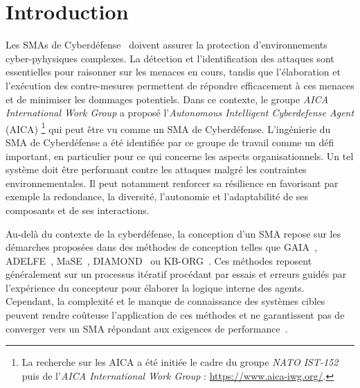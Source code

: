 \documentclass[contribution]{jfsma}
\begin{document}

\section{Introduction}


Les SMAs de Cyberdéfense~\cite{Kott2023, Singh2015} doivent assurer la protection d'environnements cyber-pyhysiques complexes.  La détection et l'identification des attaques sont essentielles pour raisonner sur les menaces en cours, tandis que l'élaboration et l'exécution des contre-mesures permettent de répondre efficacement à ces menaces et de minimiser les dommages potentiels. Dans ce contexte, le groupe \emph{AICA International Work Group} a proposé l'\emph{Autonomous Intelligent Cyberdefense Agent} (AICA)
\footnote{La recherche sur les AICA a été initiée le cadre du groupe \emph{NATO IST-152} puis de l'\emph{AICA International Work Group} : \url{https://www.aica-iwg.org/}. }
qui peut être vu comme un SMA de Cyberdéfense. L'ingénierie du SMA de Cyberdéfense a été identifiée par ce groupe de travail comme un défi important, en particulier pour ce qui concerne les aspects organisationnels. %
Un tel système doit être performant contre les attaques malgré les contraintes environnementales. Il peut notamment renforcer sa résilience en favorisant par exemple la redondance, la diversité, l'autonomie et l'adaptabilité de ses composants et de ses interactions.


Au-delà du contexte de la cyberdéfense, la conception d'un SMA repose sur les démarches proposées dans des méthodes de conception telles que GAIA~\cite{Wooldridge2000,Cernuzzi2014}, ADELFE~\cite{Mefteh2015}, MaSE~\cite{Deloach2001}, DIAMOND~\cite{Jamont2015} ou KB-ORG~\cite{Sims2008}.
Ces méthodes reposent généralement sur un processus itératif procédant par essais et erreurs guidés par l'expérience du concepteur pour élaborer la logique interne des agents. Cependant, la complexité et le manque de connaissance des systèmes cibles peuvent rendre coûteuse l'application de ces méthodes et ne garantissent pas de converger vers un SMA répondant aux exigences de performance~\cite{Mefteh2013}.
\end{document}
